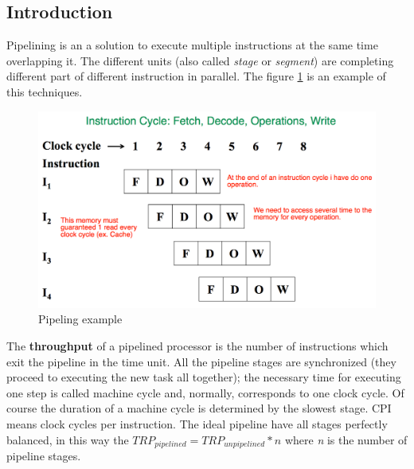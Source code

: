 \documentclass[12pt]{article}
\begin{document}
\subsection{Introduction}
Pipelining is an a solution to execute multiple instructions at the same time overlapping it. The different units (also called \textit{stage} or \textit{segment}) are completing different part of different instruction in parallel. The figure \ref{fig:pipe_ex} is an example of this techniques.
\begin{figure}[h!]
  \centering
  \includegraphics[width=\linewidth]{images/pipe_ex.png}
  \caption{Pipeling example}
  \label{fig:pipe_ex}
\end{figure}
The \textbf{throughput} of a pipelined processor is the number of instructions which exit the pipeline in the time unit. All the pipeline stages are synchronized (they proceed to executing the new task all together); the necessary time for executing one step is called machine cycle and, normally, corresponds to one clock cycle. Of course the duration of a machine cycle is determined by the slowest stage. CPI means clock cycles per instruction. The ideal pipeline have all stages perfectly balanced, in this way the $TRP_{pipelined} = TRP_{unpipelined} * n$ where \textit{n} is the number of pipeline stages.
\end{document}
